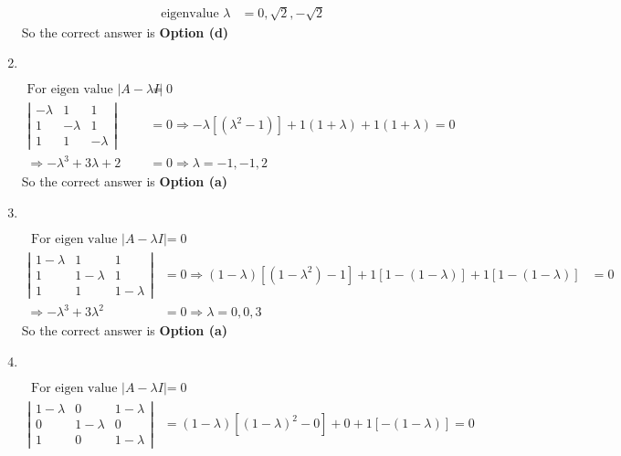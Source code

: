 \begin{enumerate}
\begin{answer}
\begin{align*}
		\text { eigenvalue } \lambda&=0, \sqrt{2},-\sqrt{2}
		\end{align*}
		So the correct answer is \textbf{Option (d)}
	\end{answer}
	\item $\left. \right. $
	\begin{answer}
		\begin{align*}
		 \text{For eigen value }|A-\lambda I|&=0\\
		\left|\begin{array}{ccc}
		-\lambda & 1 & 1 \\
		1 & -\lambda & 1 \\
		1 & 1 & -\lambda
		\end{array}\right|&=0 \Rightarrow-\lambda\left[\left(\lambda^{2}-1\right)\right]+1(1+\lambda)+1(1+\lambda)=0 \\
		\Rightarrow-\lambda^{3}+3 \lambda+2&=0 \Rightarrow \lambda=-1,-1,2
		\end{align*}
		So the correct answer is \textbf{Option (a)}		
	\end{answer}
	\item $\left. \right. $
	\begin{answer}
		\begin{align*}
	\text{ For eigen value }|A-\lambda I|&=0\\
		\left|\begin{array}{ccc}
		1-\lambda & 1 & 1 \\
		1 & 1-\lambda & 1 \\
		1 & 1 & 1-\lambda
		\end{array}\right|&=0 \Rightarrow(1-\lambda)\left[\left(1-\lambda^{2}\right)-1\right]+1[1-(1-\lambda)]+1[1-(1-\lambda)]&=0 \\
		\Rightarrow-\lambda^{3}+3 \lambda^{2}&=0 \Rightarrow \lambda=0,0,3
		\end{align*}
		So the correct answer is \textbf{Option (a)}	
	\end{answer}
	\item $\left. \right. $
	\begin{answer}
		\begin{align*}
		\text{ For eigen value }|A-\lambda I|&=0\\
		\left|\begin{array}{ccc}
		1-\lambda & 0 & 1-\lambda \\
		0 & 1-\lambda & 0 \\
		1 & 0 & 1-\lambda
		\end{array}\right|&=(1-\lambda)\left[(1-\lambda)^{2}-0\right]+0+1[-(1-\lambda)]=0 \\

\end{align*}
\end{answer}
\end{enumerate}
